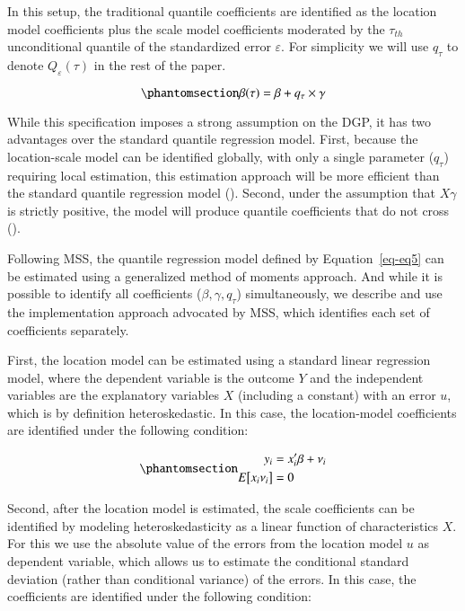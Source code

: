 \documentclass[
  authoryear,
  review,
  1p]{elsarticle}
\begin{document}
In this setup, the traditional quantile coefficients are identified as
the location model coefficients plus the scale model coefficients
moderated by the \(\tau_{th}\) unconditional quantile of the
standardized error \(\varepsilon\). For simplicity we will use
\(q_\tau\) to denote \(Q_\varepsilon(\tau)\) in the rest of the paper.

\begin{equation}\phantomsection\label{eq-eq6}{\beta(\tau) = \beta + q_\tau \times \gamma 
}\end{equation}

While this specification imposes a strong assumption on the DGP, it has
two advantages over the standard quantile regression model. First,
because the location-scale model can be identified globally, with only a
single parameter (\(q_\tau\)) requiring local estimation, this
estimation approach will be more efficient than the standard quantile
regression model (\citet{zhao2000}). Second, under the assumption that
\(X\gamma\) is strictly positive, the model will produce quantile
coefficients that do not cross (\citet{he1997}).

Following MSS, the quantile regression model defined by
Equation~\ref{eq-eq5} can be estimated using a generalized method of
moments approach. And while it is possible to identify all coefficients
(\(\beta,\gamma, q_\tau\)) simultaneously, we describe and use the
implementation approach advocated by MSS, which identifies each set of
coefficients separately.

First, the location model can be estimated using a standard linear
regression model, where the dependent variable is the outcome \(Y\) and
the independent variables are the explanatory variables \(X\) (including
a constant) with an error \(u\), which is by definition heteroskedastic.
In this case, the location-model coefficients are identified under the
following condition:

\begin{equation}\phantomsection\label{eq-eq7}{\begin{aligned}
      y_i &=x_i'\beta+\nu_i \\
      E\big[ x_i \nu_i\big] &=0
      \end{aligned}
}\end{equation}

Second, after the location model is estimated, the scale coefficients
can be identified by modeling heteroskedasticity as a linear function of
characteristics \(X\). For this we use the absolute value of the errors
from the location model \(u\) as dependent variable, which allows us to
estimate the conditional standard deviation (rather than conditional
variance) of the errors. In this case, the coefficients are identified
under the following condition:
\end{document}
